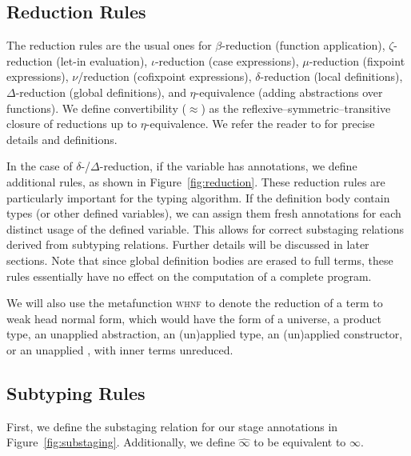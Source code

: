 \documentclass[sigplan,10pt,anonymous,review,nonacm]{acmart}
\begin{document}
\subsection{Reduction Rules}



The reduction rules are the usual ones for $\beta$-reduction (function application), $\zeta$-reduction (let-in evaluation), $\iota$-reduction (case expressions), $\mu$-reduction (fixpoint expressions), $\nu$\-/reduction (cofixpoint expressions), $\delta$-reduction (local definitions), $\Delta$-reduction (global definitions), and $\eta$-equivalence (adding abstractions over functions). We define convertibility ($\approx$) as the reflexive--symmetric--transitive closure of reductions up to $\eta$-equivalence. We refer the reader to \cite{cic-hat-bar, cic-hat, cc-hat-omega, coq} for precise details and definitions.

In the case of $\delta$-/$\Delta$-reduction, if the variable has annotations, we define additional rules, as shown in Figure~\ref{fig:reduction}. These reduction rules are particularly important for the typing algorithm. If the definition body contain \coinductive types (or other defined variables), we can assign them fresh annotations for each distinct usage of the defined variable. This allows for correct substaging relations derived from subtyping relations. Further details will be discussed in later sections. Note that since global definition bodies are erased to full terms, these rules essentially have no effect on the computation of a complete program.

We will also use the metafunction \textsc{whnf} to denote the reduction of a term to weak head normal form, which would have the form of a universe, a product type, an unapplied abstraction, an (un)applied \coinductive type, an (un)applied constructor, or an unapplied \cofixpoint, with inner terms unreduced.

\subsection{Subtyping Rules}



First, we define the substaging relation for our stage annotations in Figure~\ref{fig:substaging}. Additionally, we define $\widehat{\infty}$ to be equivalent to $\infty$.


\end{document}
